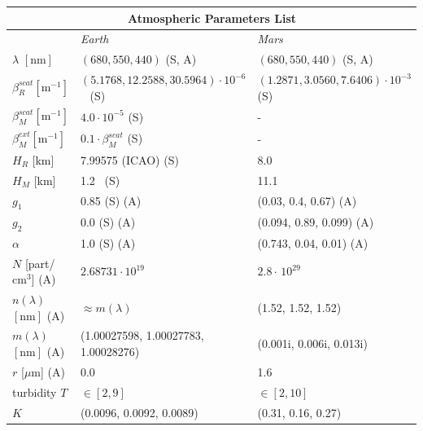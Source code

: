 \documentclass[journal]{vgtc}                %
\begin{document}
\begingroup
\setlength{\tabcolsep}{0.2em}
\begin{table}[t]
  \centering
  \begin{tabular}{|p{1.5cm}|p{3.2cm} p{3.2cm}|}
    \hline
    \multicolumn{3}{|c|}{\textbf{Atmospheric Parameters List}} \\ [0.5ex] 
    \hline
    & \textit{Earth} & \textit{Mars}\\
    {\small $\lambda$ $[\text{nm}]$} & {\small $(680, 550, 440)$ (S, A)} & {\small $(680, 550, 440)$ (S, A)} \\
    {\small $\beta_R^{scat} [\text{m}^{-1}]$} & {\tiny $(5.1768, 12.2588, 30.5964) \cdot 10^{-6}$~\cite{Bucholtz:1995} (S)} & {\tiny $(1.2871, 3.0560, 7.6406) \cdot 10^{-3}$ (S)} \\
    {\small $\beta_M^{scat} [\text{m}^{-1}]$} & {\small $4.0 \cdot 10^{-5}$ (S)} & {\small -} \\
    {\small $\beta_M^{ext} [\text{m}^{-1}]$} & {\small $0.1 \cdot \beta_M^{scat}$ (S)} & {\small -} \\
    {\small $H_R$ [km]} & {\small 7.99575 (ICAO) (S)} & {\small 8.0~\cite{Ho:2002}}\\
    {\small $H_M$ [km]} & {\small 1.2~\cite{Morales:2017} (S)} & {\small 11.1}\\
    {\small $g_1$} & {\small 0.85 (S) (A)} & {\small (0.03, 0.4, 0.67) (A)}\\ %
    {\small $g_2$} & {\small 0.0 (S) (A)} & {\small (0.094, 0.89, 0.099) (A)~\cite{Chen:2019}}\\
    {\small $\alpha$} & {\small 1.0 (S) (A)} & {\small (0.743, 0.04, 0.01) (A)~\cite{Chen:2019}}\\
    {\tiny $N$ [part/$\text{cm}^3$] (A)} & {\small $2.68731 \cdot 10^{19}$~\cite{Penndorf:1957}} & {\small $2.8 \cdot \, 10^{29}$~\cite{Ho:2002}}\\
    {\tiny $n(\lambda)$ $[\text{nm}]$ (A)} & {\small $\approx m(\lambda)$} & {\small (1.52, 1.52, 1.52)}\\
    {\tiny $m(\lambda)$ $[\text{nm}]$ (A)} & {\tiny (1.00027598, 1.00027783, 1.00028276)~\cite{Penndorf:1957} } & {\tiny (0.001i, 0.006i, 0.013i)~\cite{Ehlers:2014}}\\
    {\small $r$ [$\mu\text{m}$] (A)} & {\small 0.0} & {\small 1.6~\cite{Ehlers:2014}}\\
    {\small turbidity $T$} & {\small $\in [2, 9]$} & {\small $\in [2, 10]$}\\
    {\small $K$} & {\small (0.0096, 0.0092, 0.0089)} & {\small (0.31, 0.16, 0.27)}\\

\end{tabular}
\end{table}
\end{document}
